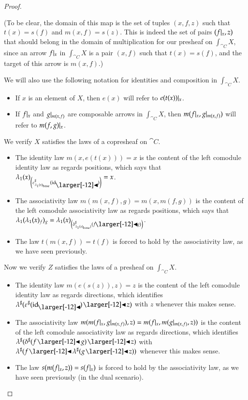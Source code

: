 \documentclass{amsart}
\begin{document}
\begin{proof}
\begin{itemize}
    (To be clear, the domain of this map is the set of tuples
    $(x, f, z)$ such that $t(x) = s(f)$ and $m(x, f) = s(z)$. This is
    indeed the set of pairs $(f|_{x}, z)$ that should belong in the
    domain of multiplication for our presheaf on $\int_{\cat{C}}X$,
    since an arrow $f|_{x}$ in $\int_{\cat{C}}X$ is a pair $(x, f)$ such
    that $t(x) = s(f)$, and the target of this arrow is $m(x, f)$.)
  \end{itemize}

  We will also use the following notation for identities and
  composition in $\int_{\cat{C}}X$.
  \begin{itemize}
  \item If $x$ is an element of $X$, then $e(x)$ will refer to
    $e(t(x))|_{x}$.
  \item If $f|_{x}$ and $g|_{m(x,f)}$ are composable arrows in
    $\int_{\cat{C}}X$, then $m(f|_{x}, g|_{m(x,f)})$ will refer to
    $m(f, g)|_{x}$.
  \end{itemize}

  We verify $X$ satisfies the laws of a copresheaf on $\cat{C}$.
  \begin{itemize}
  \item The identity law $m(x, e(t(x))) = x$ is the content of the left
    comodule identity law as regards positions, which says that
    $\posmapof{\lambda}{x}_{\left(\dirmapof{\varepsilon}{\posmapof{\lambda}{x}_\base}{\idsubd}\right)} = x$.
  \item The associativity law $m(m(x, f), g) = m(x, m(f, g))$ is the
    content of the left comodule associativity law as regards positions,
    which says that
    $\posmapof{\lambda}{\posmapof{\lambda}{x}_f}_g =
    \posmapof{\lambda}{x}_{\left(\dirmapof{\delta}{\posmapof{\lambda}{x}_\base)}{f
        \subd g}\right)}$.
  \item The law $t(m(x, f)) = t(f)$ is forced to hold by the
    associativity law, as we have seen previously.
  \end{itemize}
  
  Now we verify $Z$ satisfies the laws of a presheaf on $\int_{\cat{C}}X$.
  \begin{itemize}
  \item The identity law $m(e(s(z)), z) = z$ is the content of the left
    comodule identity law as regards directions, which identifies
    ${\anydirmapof{\lambda}{\anydirmapof{\varepsilon}{\idsubd} \subd z}}$
    with $z$ whenever this makes sense.
  \item The associativity law
    $m(m(f|_{x}, g|_{m(x,f)}), z) = m(f|_{x}, m(g|_{m(x,f)}, z))$ is the
    content of the left comodule associativity law as regards
    directions, which identifies
    ${\anydirmapof{\lambda}{\anydirmapof{\delta}{f \subd g} \subd z}}$
    with
    ${\anydirmapof{\lambda}{f \subd \anydirmapof{\lambda}{g \subd z}}}$
    whenever this makes sense.
  \item The law $s(m(f|_{x}, z)) = s(f|_{x})$ is forced to hold by the
    associativity law, as we have seen previously (in the dual
    scenario).
  \end{itemize}


\end{proof}
\end{document}
